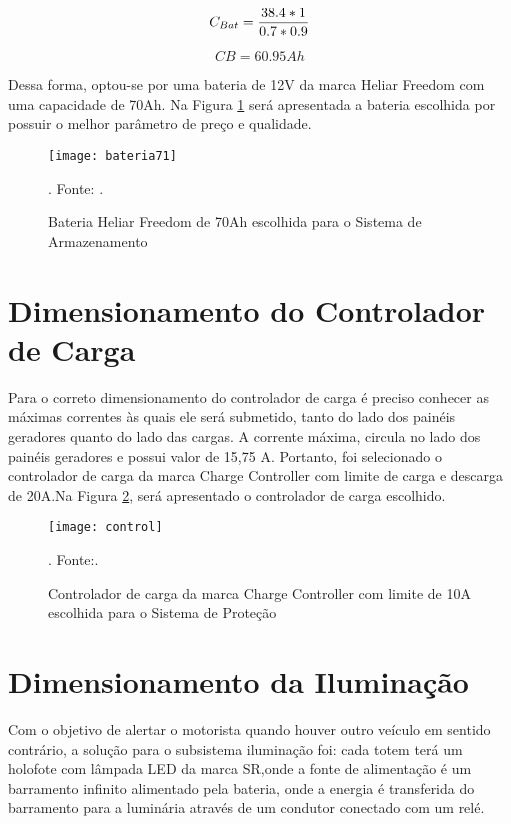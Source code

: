 \begin{equation}
    C_{Bat} = \frac{38.4*1}{0.7*0.9}\\
\end{equation}

\begin{equation}
    CB = 60.95 Ah
\end{equation}


Dessa forma, optou-se por uma bateria de 12V da marca Heliar Freedom com uma capacidade de 70Ah. Na Figura \ref{fig:bateria71} será apresentada a bateria escolhida por possuir o melhor parâmetro de preço e qualidade.


\begin{figure}[H]
\centering
\texttt{[image: bateria71]}
\caption{Bateria Heliar Freedom de 70Ah escolhida para o Sistema de Armazenamento}. Fonte: \cite{bateria_heliar_70}.
\label{fig:bateria71}
\end{figure}
\FloatBarrier

\section{Dimensionamento do Controlador de Carga}

Para o correto dimensionamento do controlador de carga é preciso conhecer as máximas correntes às quais ele será submetido, tanto do lado dos painéis geradores quanto do lado das cargas. A corrente máxima, circula no lado dos painéis geradores e possui valor de 15,75 A. Portanto, foi selecionado o controlador de carga da marca Charge Controller com limite de carga e descarga de 20A.Na Figura \ref{fig:control}, será apresentado o controlador de carga escolhido.

\begin{figure}[H]
\centering
\texttt{[image: control]}
    \caption{Controlador de carga da marca Charge Controller com limite de 10A escolhida para o Sistema de Proteção}. Fonte:\cite{controlador}.
\label{fig:control}
\end{figure}
\FloatBarrier

\section{Dimensionamento da Iluminação}

Com o objetivo de alertar o motorista quando houver outro veículo em sentido contrário, a solução para o subsistema iluminação foi: cada totem terá um holofote com lâmpada LED da marca SR,onde a fonte de alimentação é um barramento infinito alimentado pela bateria, onde a energia é transferida do barramento para a luminária através de um condutor conectado com um relé. 


